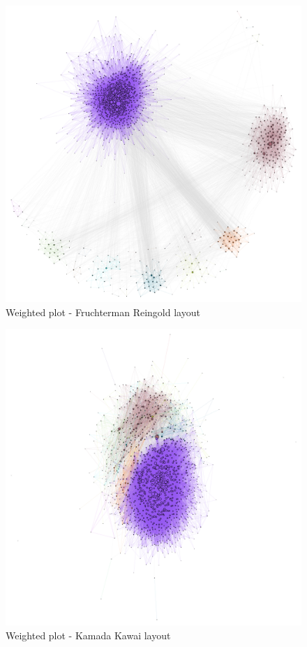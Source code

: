 \documentclass[12pt, a4paper]{article}
\begin{document}
\begin{figure}
    \centering
    \includegraphics[width=\textwidth]{src/youtube/hdg_weighted/hdg_pg_fg}
    \caption{Weighted plot - Fruchterman Reingold layout}
    \label{fig:hdg_pg_fg}
\end{figure}

\begin{figure}
    \centering
    \includegraphics[width=\textwidth]{src/youtube/hdg_weighted/hdg_pg_kawai}
    \caption{Weighted plot - Kamada Kawai layout}
    \label{fig:hdg_pg_kawai}
\end{figure}
\end{document}
